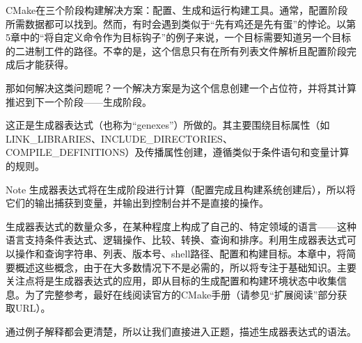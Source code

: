 

CMake在三个阶段构建解决方案：配置、生成和运行构建工具。通常，配置阶段所需数据都可以找到。然而，有时会遇到类似于“先有鸡还是先有蛋”的悖论。以第5章中的“将自定义命令作为目标钩子”的例子来说，一个目标需要知道另一个目标的二进制工件的路径。不幸的是，这个信息只有在所有列表文件解析且配置阶段完成后才能获得。

那如何解决这类问题呢？一个解决方案是为这个信息创建一个占位符，并将其计算推迟到下一个阶段——生成阶段。

这正是生成器表达式（也称为“genexes”）所做的。其主要围绕目标属性（如LINK\_LIBRARIES、INCLUDE\_DIRECTORIES、COMPILE\_DEFINITIONS）及传播属性创建，遵循类似于条件语句和变量计算的规则。

\begin{myNotic}{Note}
生成器表达式将在生成阶段进行计算（配置完成且构建系统创建后），所以将它们的输出捕获到变量，并输出到控制台并不是直接的操作。
\end{myNotic}

生成器表达式的数量众多，在某种程度上构成了自己的、特定领域的语言——这种语言支持条件表达式、逻辑操作、比较、转换、查询和排序。利用生成器表达式可以操作和查询字符串、列表、版本号、shell路径、配置和构建目标。本章中，将简要概述这些概念，由于在大多数情况下不是必需的，所以将专注于基础知识。主要关注点将是生成器表达式的应用，即从目标的生成配置和构建环境状态中收集信息。为了完整参考，最好在线阅读官方的CMake手册（请参见“扩展阅读”部分获取URL）。

通过例子解释都会更清楚，所以让我们直接进入正题，描述生成器表达式的语法。















